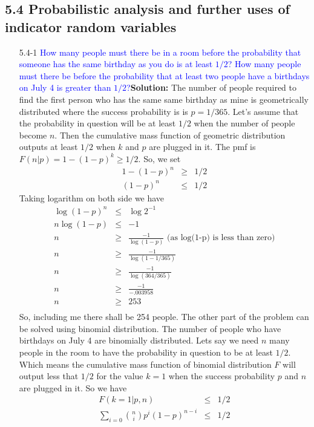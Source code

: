 \documentclass{article}
\begin{document}
\subsection*{5.4 Probabilistic analysis and further uses of indicator random variables}
\begin{enumerate}
\item[5.4-1] \textcolor{blue}{How many people must there be in a room before the probability that someone has the same birthday as you do is at least $1/2$? How many people must there be before the probability that at least two people have a birthdays on July 4 is greater than $1/2$?}\textbf{Solution:} The number of people required to find the first person who has the same same birthday as mine is geometrically distributed where the success probability is is $p=1/365$. Let's assume that the probability in question will be at least $1/2$ when the number of people become $n$. Then the cumulative mass function of geometric distribution outputs at least $1/2$ when $k$ and $p$ are plugged in it. The pmf is $F(n|p) = 1-(1-p)^k \geq 1/2$. So, we set
\begin{eqnarray*}
1-(1-p)^n &\geq& 1/2\\
(1-p)^n &\leq& 1/2
\end{eqnarray*}
Taking logarithm on both side we have 
\begin{eqnarray*}
\log(1-p)^n &\leq& \log 2^{-1}\\
n\log(1-p) &\leq& -1\\
n &\geq& \frac{-1}{\log(1-p)} \text{   (as log(1-p) is less than zero)}\\
n &\geq& \frac{-1}{\log(1-1/365)}\\
n &\geq& \frac{-1}{\log(364/365)}\\
n &\geq& \frac{-1}{-.003958}\\
n &\geq& 253\\
\end{eqnarray*}
So, including me there shall be 254 people. 
The other part of the problem can be solved using binomial distribution. The number of people who have birthdays on July 4 are binomially distributed. Lets say we need $n$ many people in the room to have the probability in question to be at least $1/2$. Which means the cumulative mass function of binomial distribution $F$ will output less that $1/2$ for the value $k=1$ when the success probability $p$ and $n$ are plugged in it. So we have  
\begin{eqnarray*}
F(k=1|p,n) &\leq& 1/2\\
\sum_{i=0}\binom{n}{i}p^i(1-p)^{n-i} &\leq& 1/2\\

\end{eqnarray*}
\end{enumerate}
\end{document}
